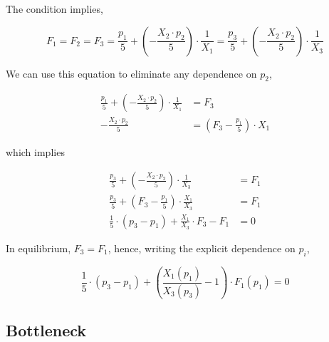 \documentclass[american]{scrartcl}
\begin{document}
The condition implies,

\begin{equation}
	F_1 = F_2 = F_3 = \frac{p_1}{5} + \left(- \frac{X_2 \cdot p_2}{5} \right) \cdot \frac{1}{X_1} = \frac{p_3}{5} + \left(- \frac{X_2 \cdot p_2}{5} \right) \cdot \frac{1}{X_3}
\end{equation}

We can use this equation to eliminate any dependence on $p_2$,

\begin{equation}
	\begin{split}
		\frac{p_1}{5} + \left(- \frac{X_2 \cdot p_2}{5} \right) \cdot \frac{1}{X_1} &= F_3 \\
		- \frac{X_2 \cdot p_2}{5} &= \left( F_3 - \frac{p_1}{5} \right) \cdot X_1
	\end{split}
\end{equation}

which implies

\begin{equation}
	\begin{split}
		\frac{p_3}{5} + \left(- \frac{X_2 \cdot p_2}{5} \right) \cdot \frac{1}{X_3} &= F_1 \\
		\frac{p_3}{5} + \left( F_3 - \frac{p_1}{5} \right) \cdot \frac{X_1}{X_3} &= F_1 \\
		\frac{1}{5} \cdot (p_3 - p_1) + \frac{X_1}{X_3} \cdot F_3 - F_1 &= 0
	\end{split}
\end{equation}

In equilibrium, $F_3 = F_1$, hence, writing the explicit dependence on $p_i$,

\begin{equation}
	\frac{1}{5} \cdot (p_3 - p_1) + \left( \frac{X_1(p_1)}{X_3(p_3)} - 1 \right) \cdot F_1(p_1)= 0
\end{equation}

\newpage
\subsection{Bottleneck}


\vspace{0.5cm}
\end{document}
